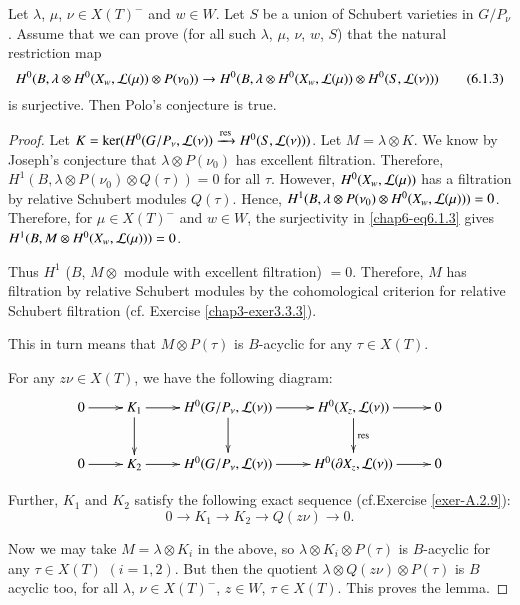 \setcounter{theorem}{1}
\begin{lemma}\label{chap6-lem6.1.2}
Let $\lambda$, $\mu$, $\nu\in X(T)^{-}$ and $w\in W$. Let $S$ be a
union of Schubert varieties in $G/P_{\nu}$. Assume that we can prove
(for all such $\lambda$, $\mu$, $\nu$, $w$, $S$) that the natural
restriction map
{\fontsize{10pt}{12pt}\selectfont
\begin{equation*}
H^{0}(B,\lambda\otimes H^{0}(X_{w},\mathcal{L}(\mu))\otimes P(\nu_{0}))\to
H^{0}(B,\lambda\otimes H^{0}(X_{w},\mathcal{L}(\mu))\otimes
H^{0}(S,\mathcal{L}(\nu)))\tag{6.1.3}\label{chap6-eq6.1.3} 
\end{equation*}}\relax
is surjective. Then Polo's conjecture is true.
\end{lemma}

\begin{proof}
Let
$K=\ker(H^{0}(G/P_{\nu},\mathcal{L}(\nu))\xrightarrow{\operatorname{res}}H^{0}(S,\mathcal{L}(\nu)))$. Let
$M=\lambda\otimes K$. We know by Joseph's conjecture that
$\lambda\otimes P(\nu_{0})$ has excellent filtration. Therefore,
$H^{1}(B,\lambda\otimes P(\nu_{0})\otimes Q(\tau))=0$ for all
$\tau$. However, $H^{0}(X_{w},\mathcal{L}(\mu))$ has a filtration by relative
Schubert modules $Q(\tau)$. Hence, $H^{1}(B,\lambda\otimes
P(\nu_{0})\otimes H^{0}(X_{w},\mathcal{L}(\mu)))=0$. Therefore, for $\mu\in
X(T)^{-}$ and $w\in W$, the surjectivity in \eqref{chap6-eq6.1.3}
gives $H^{1}(B,M\otimes H^{0}(X_{w},\mathcal{L}(\mu)))=0$.

Thus $H^{1}$ ($B$, $M\otimes$ module with excellent filtration)
$=0$. Therefore, $M$ has filtration by relative Schubert modules by
the cohomological criterion for relative Schubert filtration (cf.\@
Exercise \ref{chap3-exer3.3.3}).

This in turn means that $M\otimes P(\tau)$ is $B$-acyclic for any
$\tau\in X(T)$.

For any $z\nu\in X(T)$, we have the following diagram:
\[
\xymatrix{
0\ar[r] & K_{1}\ar[d]\ar[r] & H^{0}(G/P_{\nu},\L(\nu))\ar[d]\ar[r] &
H^{0}(X_{z},\L(\nu))\ar[d]^{\res}\ar[r] & 0\\
0\ar[r] & K_{2}\ar[r] & H^{0}(G/P_{\nu},\L(\nu))\ar[r] & H^{0}(\p
X_{z},\L(\nu))\ar[r] & 0 
}
\]

Further, $K_{1}$ and $K_{2}$ satisfy the following exact sequence
(cf.\@ Exercise \ref{exer-A.2.9}):
$$
0\to K_{1}\to K_{2}\to Q(z\nu)\to 0.
$$

Now we may take $M=\lambda\otimes K_{i}$ in the above, so
$\lambda\otimes K_{i}\otimes P(\tau)$ is $B$-acyclic for any $\tau\in
X(T)$ $(i=1,2)$. But then the quotient $\lambda\otimes Q(z\nu)\otimes
P(\tau)$ is $B$ acyclic too, for all $\lambda$, $\nu\in X(T)^{-}$,
$z\in W$, $\tau\in X(T)$. This proves the lemma.
\end{proof}

